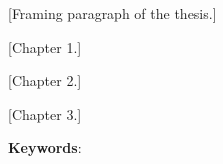 
[Framing paragraph of the thesis.]

[Chapter 1.]

[Chapter 2.]

[Chapter 3.]

\vspace{0.5cm}
\noindent\textbf{Keywords}: %
\\
